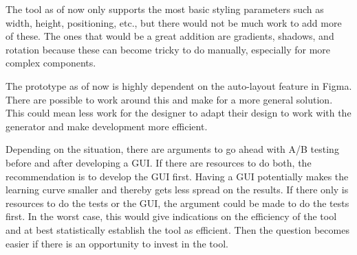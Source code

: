 The tool as of now only supports the most basic styling parameters such as width, height, positioning, etc., but there would not be much work to add more of these. The ones that would be a great addition are gradients, shadows, and rotation because these can become tricky to do manually, especially for more complex components. 

The prototype as of now is highly dependent on the auto-layout feature in Figma. There are possible to work around this and make for a more general solution. This could mean less work for the designer to adapt their design to work with the generator and make development more efficient. 

Depending on the situation, there are arguments to go ahead with A/B testing before and after developing a GUI. If there are resources to do both, the recommendation is to develop the GUI first. Having a GUI potentially makes the learning curve smaller and thereby gets less spread on the results. If there only is resources to do the tests or the GUI, the argument could be made to do the tests first. In the worst case, this would give indications on the efficiency of the tool and at best statistically establish the tool as efficient. Then the question becomes easier if there is an opportunity to invest in the tool. 

